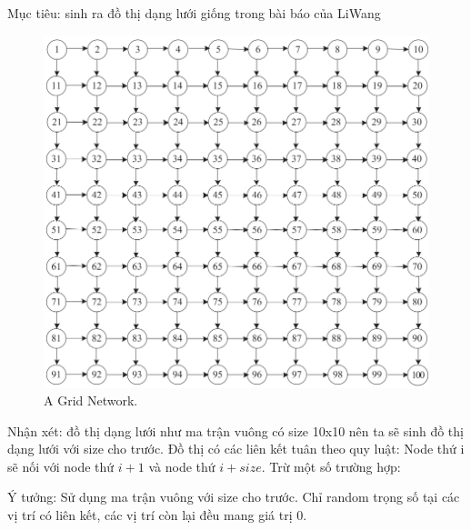 \documentclass[a4paper]{article}
\begin{document}
{Mục tiêu: sinh ra đồ thị dạng lưới giống trong bài báo của LiWang}
\begin{figure}[h]
    \centering
    \includegraphics[scale=0.8]{grid.png}
    \caption{A Grid Network.}
    \label{fig:enter-label}
\end{figure}
\newpage
{Nhận xét: đồ thị dạng lưới như ma trận vuông có size 10x10 nên ta sẽ sinh đồ thị dạng lưới với size cho trước. Đồ thị có các liên kết tuân theo quy luật: Node thứ i sẽ nối với node thứ $i+1$ và node thứ $i+size$. Trừ một số trường hợp: }

{Ý tưởng: Sử dụng ma trận vuông với size cho trước. Chỉ random trọng số tại các vị trí có liên kết, các vị trí còn lại đều mang giá trị 0.}
\end{document}
